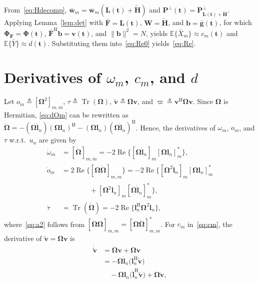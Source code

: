 \documentclass[journal]{IEEEtran}
\newcommand{\E}{\mathbb{E}}
\newcommand{\tr}{\operatorname{Tr}}
\newcommand{\RE}{\operatorname{Re}}
\newcommand{\bt}{\mathbf{t}}
\newcommand{\gb}{\bar{\mathbf{g}}}
\newcommand{\Htl}{\tilde{\mathbf{H}}}
\newcommand{\bL}{\mathbf{L}}
\newcommand{\wb}{\bar{\mathbf{w}}}
\newcommand{\bv}{\mathbf{v}}
\newcommand{\bb}{\mathbf{b}}
\newcommand{\bl}{\mathbf{l}}
\newcommand{\bF}{\mathbf{F}}
\newcommand{\Fb}{\bar{\mathbf{F}}}
\newcommand{\bW}{\mathbf{W}}
\newcommand{\bOm}{\boldsymbol{\Omega}}
\newcommand{\bPhi}{\boldsymbol{\Phi}}
\newcommand{\PHp}{\mathbf{P}^{\perp}(\bt)}
\begin{document}
\begin{IEEEproof}
From~\eqref{eq:Hdecomp}, $\wb_m=\wb_m(\bL(\bt)+\Htl)$ and $\PHp=\mathbf P_{\bL(\bt)+\Htl}^\perp$. Applying Lemma~\ref{lem:det} with $\Fb=\bL(\bt)$, $\bW=\Htl$, and $\bb=\gb(\bt)$, for which $\bPhi_{\bF}=\bPhi(\bt)$, $\Fb^{\mathrm{H}}\bb=\bv(\bt)$, and $\|\bb\|^2=N$, yields $\E\{\bar X_m\}\approx c_m(\bt)$ and $\E\{\bar Y\}\approx d(\bt)$. Substituting them into~\eqref{eq:Re0} yields~\eqref{eq:Re}.
\end{IEEEproof}

\section{Derivatives of $\omega_m$, $c_m$, and $d$}\label{app:grad}
Let $o_m\triangleq[\bOm^2]_{m,m}$, $\tau\triangleq\tr(\bOm)$, $\tilde{\bv}\triangleq\bOm\bv$, and $\varpi\triangleq\bv^{\mathrm{H}}\bOm\bv$. Since $\bOm$ is Hermitian, \eqref{eq:dOm} can be rewritten as $\dot{\bOm}=-(\bOm\dot{\bl}_n)(\bOm\bl_n)^{\mathrm{H}}-(\bOm\bl_n)(\bOm\dot{\bl}_n)^{\mathrm{H}}$. Hence, the derivatives of $\omega_m$, $o_m$, and $\tau$ w.r.t.\ $u_n$ are given by
\begin{align}
\dot\omega_m&=[\dot{\bOm}]_{m,m}=-2\RE\big\{[\bOm\dot{\bl}_n]_m[\bOm\bl_n]_m^{\mathrm{*}}\big\},\label{eq:a1}\\
\dot o_m&=2\RE\big\{[\bOm\dot{\bOm}]_{m,m}\big\}=-2\RE\big\{[\bOm^2\dot{\bl}_n]_m[\bOm\bl_n]_m^{\mathrm{*}}\nonumber\\
&\qquad\qquad+[\bOm^2\bl_n]_m[\bOm\dot{\bl}_n]_m^{\mathrm{*}}\big\},\label{eq:a2}\\
\dot\tau&=\tr(\dot{\bOm})=-2\RE\big\{\bl_n^{\mathrm{H}}\bOm^2\dot{\bl}_n\big\},\label{eq:a3}
\end{align}
where~\eqref{eq:a2} follows from $[\dot{\bOm}\bOm]_{m,m}=[\bOm\dot{\bOm}]_{m,m}^{\mathrm{*}}$. For $c_m$ in~\eqref{eq:cm}, the derivative of $\tilde{\bv}=\bOm\bv$ is
\begin{equation}\label{eq:a4}
\begin{aligned}
\dot{\tilde{\bv}}
&=\dot{\bOm}\bv+\bOm\dot{\bv}\\
&=-\bOm\dot{\bl}_n
 \big(\bl_n^{\mathrm{H}}\tilde{\bv}\big)\\
&\quad-\bOm\bl_n
 \big(\dot{\bl}_n^{\mathrm{H}}\tilde{\bv}\big)
 +\bOm\dot{\bv},
\end{aligned}
\end{equation}
\end{document}
